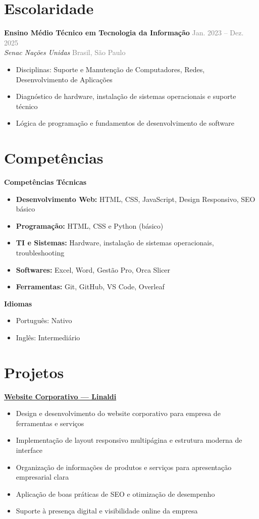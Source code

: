 \documentclass[a4paper, 12pt]{article}
\newcommand{\resumeSubSection}[4]{%
\vspace{-1pt}\noindent
\textbf{#1} \hfill \textcolor{gray}{#2}\\
\textit{#3} \hfill \textcolor{gray}{#4}
}
\newcommand{\resumeItemsSubSection}[1]{%
\vspace{-8pt}\small \begin{itemize}\setlength{\itemsep}{-0.3em}
#1
\end{itemize}
}
\newcommand{\resumeSkillSubsection}[1]{%
\noindent \textbf{#1}\\[-6pt]
}
\begin{document}

\section{Escolaridade}
\resumeSubSection
{Ensino Médio Técnico em Tecnologia da Informação}
{Jan. 2023 -- Dez. 2025}
{Senac Nações Unidas}
{Brasil, São Paulo}

\resumeItemsSubSection{
\item Disciplinas: Suporte e Manutenção de Computadores, Redes, Desenvolvimento de Aplicações
\item Diagnóstico de hardware, instalação de sistemas operacionais e suporte técnico
\item Lógica de programação e fundamentos de desenvolvimento de software
}


\section{Competências}

\resumeSkillSubsection{Competências Técnicas}

\resumeItemsSubSection{
\item \textbf{Desenvolvimento Web:} HTML, CSS, JavaScript, Design Responsivo, SEO básico
\item \textbf{Programação:} HTML, CSS e Python (básico)
\item \textbf{TI e Sistemas:} Hardware, instalação de sistemas operacionais, troubleshooting
\item \textbf{Softwares:} Excel, Word, Gestão Pro, Orca Slicer
\item \textbf{Ferramentas:} Git, GitHub, VS Code, Overleaf
}

\resumeSkillSubsection{Idiomas}
\resumeItemsSubSection{
\item Português: Nativo
\item Inglês: Intermediário
}


\section{Projetos}

\resumeSkillSubsection{\href{https://github.com/nzlinaldi/linaldiWebsite}{Website Corporativo — Linaldi}}

\resumeItemsSubSection{
\item Design e desenvolvimento do website corporativo para empresa de ferramentas e serviços
\item Implementação de layout responsivo multipágina e estrutura moderna de interface
\item Organização de informações de produtos e serviços para apresentação empresarial clara
\item Aplicação de boas práticas de SEO e otimização de desempenho
\item Suporte à presença digital e visibilidade online da empresa
}
\end{document}
